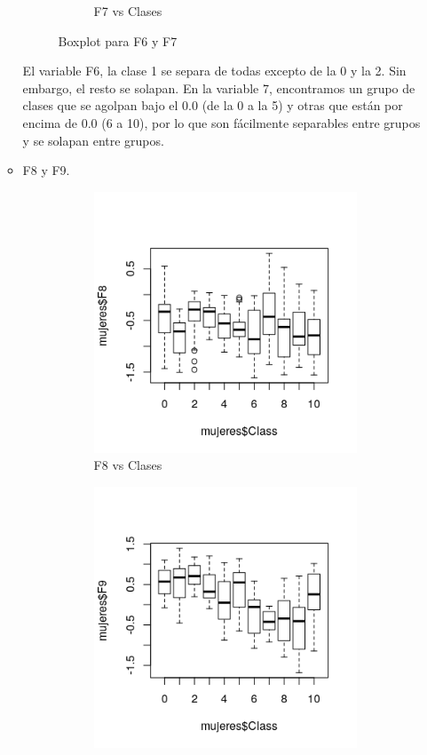 \begin{itemize}
\begin{itemize}
\begin{figure}[H]
\begin{subfigure}{.5\textwidth}
				\caption{F7 vs Clases}
				\label{fig:bpmF7}
			\end{subfigure}
			\caption{Boxplot para F6 y F7}
			\label{fig:bpm67}
		\end{figure}
		
		El variable F6, la clase 1 se separa de todas excepto de la 0 y la 2. Sin embargo, el resto se solapan. En la variable 7, encontramos un grupo de clases que se agolpan bajo el 0.0 (de la 0 a la 5) y otras que están por encima de 0.0 (6 a 10), por lo que son fácilmente separables entre grupos y se solapan entre grupos.
		
		\item F8 y F9.
		
		\begin{figure}[H]
			\centering
			\begin{subfigure}{.5\textwidth}
				\centering
				\includegraphics[width=.8\linewidth]{bpmF8.png}
				\caption{F8 vs Clases}
				\label{fig:bpmF8}
			\end{subfigure}%
			\begin{subfigure}{.5\textwidth}
				\centering
				\includegraphics[width=.8\linewidth]{bpmF9.png}

\end{subfigure}
\end{figure}
\end{itemize}
\end{itemize}
